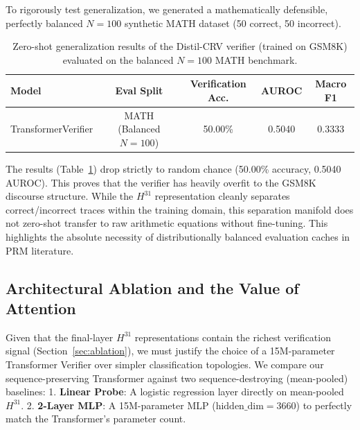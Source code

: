 \documentclass{article}
\begin{document}
To rigorously test generalization, we generated a mathematically defensible, perfectly balanced $N=100$ synthetic MATH dataset (50 correct, 50 incorrect).

\begin{table}[ht]
\centering
\caption{Zero-shot generalization results of the Distil-CRV verifier (trained on GSM8K) evaluated on the balanced $N=100$ MATH benchmark.}
\label{tab:generalization}
\vspace{3pt}
\begin{tabular}{@{}lcccc@{}}
\toprule
\textbf{Model} & \textbf{Eval Split} & \textbf{Verification Acc.} & \textbf{AUROC} & \textbf{Macro F1} \\ \midrule
TransformerVerifier & MATH (Balanced $N=100$) & 50.00\% & 0.5040 & 0.3333 \\ \bottomrule
\end{tabular}
\end{table}

The results (Table~\ref{tab:generalization}) drop strictly to random chance (50.00\% accuracy, 0.5040 AUROC). This proves that the verifier has heavily overfit to the GSM8K discourse structure. While the $H^{31}$ representation cleanly separates correct/incorrect traces within the training domain, this separation manifold does not zero-shot transfer to raw arithmetic equations without fine-tuning. This highlights the absolute necessity of distributionally balanced evaluation caches in PRM literature.

\subsection{Architectural Ablation and the Value of Attention}
\label{sec:architectural_ablation}

Given that the final-layer $H^{31}$ representations contain the richest verification signal (Section~\ref{sec:ablation}), we must justify the choice of a 15M-parameter Transformer Verifier over simpler classification topologies. We compare our sequence-preserving Transformer against two sequence-destroying (mean-pooled) baselines:
1. \textbf{Linear Probe}: A logistic regression layer directly on mean-pooled $H^{31}$.
2. \textbf{2-Layer MLP}: A 15M-parameter MLP ($\text{hidden\_dim} = 3660$) to perfectly match the Transformer's parameter count.
\end{document}
